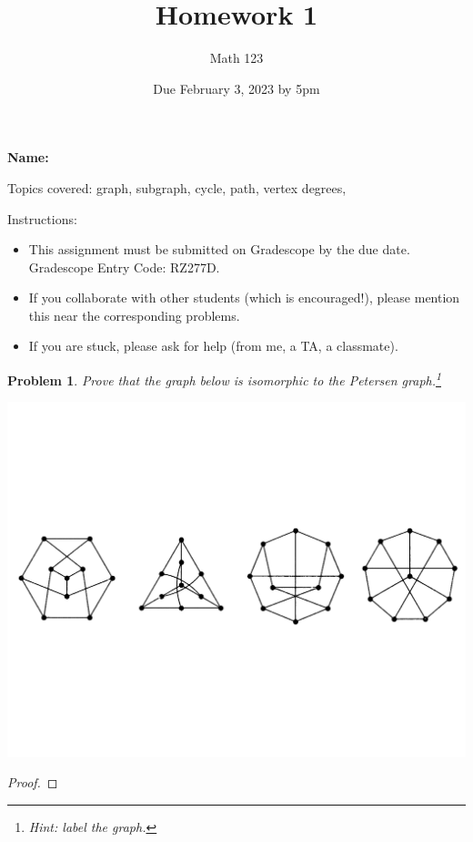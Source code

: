 \documentclass[11pt]{article}
\author{Math 123}
\date{Due February 3, 2023 by 5pm}
\title{Homework 1}
\newtheorem{problem}{Problem}
\begin{document}
\maketitle

{\bf\Large Name:} 


\vspace{.3in}
Topics covered: graph, subgraph, cycle, path, vertex degrees, 

Instructions: 
\begin{itemize}
\item This assignment must be submitted on Gradescope by the due date. Gradescope Entry Code: RZ277D. 
\item If you collaborate with other students (which is encouraged!), please mention this near the corresponding problems. 
\item If you are stuck, please ask for help (from me, a TA, a classmate).  
\end{itemize}

\pagebreak 




\begin{problem}
Prove that the graph below is isomorphic to the Petersen graph.\footnote{Hint: label the graph.}
\begin{center}
\includegraphics[scale=.4]{petersen.pdf}
\end{center}
\end{problem}

\begin{proof}

\end{proof}
\end{document}
